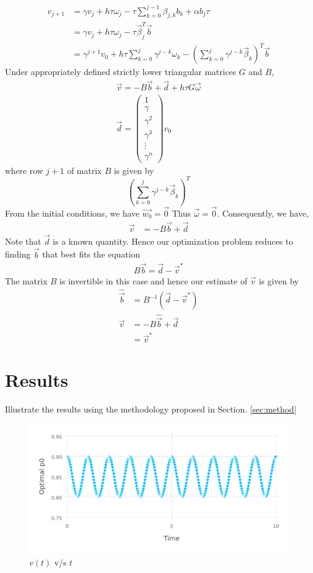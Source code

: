 \documentclass{ifacconf}
\begin{document}
\begin{align} \label{eq:p0evolution}
v_{j+1} &= \gamma v_j + h\tau\omega_j - \tau\sum_{k=0}^{j-1}\beta_{j,k}b_k
	   + \alpha b_j\tau \\
	   &= \gamma v_j + h\tau\omega_j - \tau \vec{\beta}_j^T \vec{b}\\
	   &= \gamma^{j+1}v_0 
	   + h\tau\sum_{k=0}^{j} \gamma^{j-k}\omega_k
	   - \left(\sum_{k=0}^{j} \gamma^{j-k} \vec{\beta}_k\right)^T \vec{b}
\end{align}
Under appropriately defined strictly lower triangular matrices $G$ and $B$,
\begin{align}
	\vec{v} = - B\vec{b}+\vec{d} + h\tau G\vec{\omega}  \\
	\vec{d}=\begin{pmatrix} 1 \\ \gamma \\  \gamma^2 \\ \gamma^3 \\ \vdots \\ \gamma^{n} \end{pmatrix}v_0
\end{align}
where row $j+1$ of matrix $B$ is given by
\[
\left(\sum_{k=0}^{j} \gamma^{j-k} \vec{\beta}_k\right)^T
\]
From the initial conditions, we have $\vec{w_0} = \vec{0}$ Thus $\vec{\omega} =
\vec{0}$. Consequently, we have,
\begin{align}
	\vec{v} &= -B\vec{b} + \vec{d}
\end{align}
Note that $\vec{d}$ is a known quantity.
Hence our optimization problem reduces to finding $\vec{b}$ that best fits the equation
\begin{align}
	B\vec{b} = \vec{d}-\vec{v}^*
\end{align}
The matrix $B$ is invertible in this case and hence our estimate of $\vec{v}$ is given by 
\begin{align}
	\hat{\vec{b}} &= B^{-1} \left( \vec{d} - \vec{v}^* \right)\\
	\vec{v} &= -B\hat{\vec{b}} + \vec{d} \\
	        &= \vec{v}^*
\end{align}
\section{Results}
Illustrate the results using the methodology proposed in Section. \ref{sec:method}

\begin{figure}
	\label{fig:estv}
	\includegraphics[width=\linewidth]{estv.pdf}
	\caption{$v(t)$ v/s $t$}
\end{figure}
\end{document}
